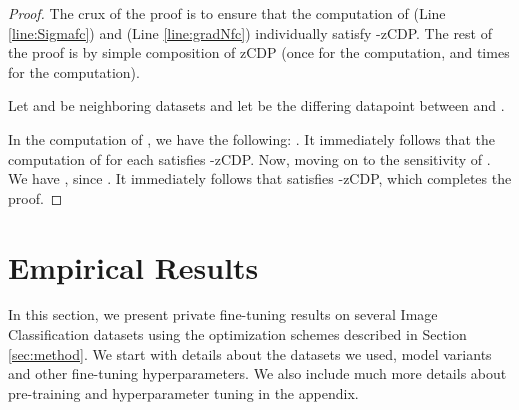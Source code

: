 \documentclass[letterpaper]{article} \usepackage{fullpage}
\begin{document}
\begin{proof}
The crux of the proof is to ensure that the computation of  (Line \ref{line:Sigmafc}) and  (Line \ref{line:gradNfc}) individually satisfy -zCDP. The rest of the proof is by simple composition of zCDP \cite{bun2016concentrated} (once for the  computation, and  times for the  computation).

Let  and  be neighboring datasets and let  be the differing datapoint between  and . 

In the computation of , we have the following: . It immediately follows that the computation of  for each  satisfies -zCDP. Now, moving on to the sensitivity of . We have , since . It immediately follows that  satisfies -zCDP, which completes the proof.
\end{proof}


\section{Empirical Results}
In this section, we present private fine-tuning results on several Image Classification datasets using the optimization schemes described in Section \ref{sec:method}.  We start with details about the datasets we used, model variants and other fine-tuning hyperparameters. We also include much more details about pre-training and hyperparameter tuning in the appendix.
\end{document}
